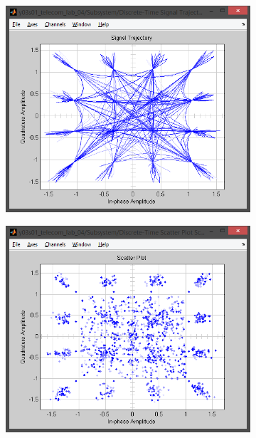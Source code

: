 \documentclass[
	a4paper,
	oneside,
	BCOR = 10mm,
	DIV = 12,
	12pt,
	headings = normal,
]{scrartcl}
\begin{document}
\begin{figure}[!htbp]
\begin{subfigure}{\textwidth / 3}
						\caption{}
						\label{subfig:rolloff-1p0-eye-out}
					\end{subfigure}%
					\begin{subfigure}{\textwidth / 3}
						\centering
						\includegraphics[height = 7\baselineskip]{../01-solution/rolloff-1p0-signal-trajectory-out.png}
						\caption{}
						\label{subfig:rolloff-1p0-signal-trajectory-out}
					\end{subfigure}%
					\begin{subfigure}{\textwidth / 3}
						\centering
						\includegraphics[height = 7\baselineskip]{../01-solution/rolloff-1p0-scatter-plot-out.png}

\end{subfigure}
\end{figure}
\end{document}

